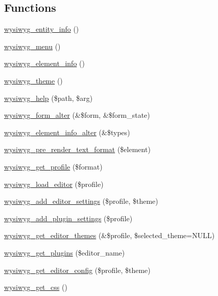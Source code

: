 \subsection*{Functions}
\begin{DoxyCompactItemize}
\item 
\hyperlink{wysiwyg_8module_abb82c2196b81d43dfdfe589eaf10a410}{wysiwyg\_\-entity\_\-info} ()
\item 
\hyperlink{wysiwyg_8module_a7bbcb615ff86965ede6de1ebdaf1f360}{wysiwyg\_\-menu} ()
\item 
\hyperlink{wysiwyg_8module_a558b7da961229a8d501fa8581d802093}{wysiwyg\_\-element\_\-info} ()
\item 
\hyperlink{wysiwyg_8module_a03b61c521946527bba7ecee753da3256}{wysiwyg\_\-theme} ()
\item 
\hyperlink{wysiwyg_8module_a4926cb9285c08293cd92c520a8161248}{wysiwyg\_\-help} (\$path, \$arg)
\item 
\hyperlink{wysiwyg_8module_a452faad91d7d0855861a5a36739013a7}{wysiwyg\_\-form\_\-alter} (\&\$form, \&\$form\_\-state)
\item 
\hyperlink{wysiwyg_8module_aa482dbbc6100de3682a8deb035a03ed5}{wysiwyg\_\-element\_\-info\_\-alter} (\&\$types)
\item 
\hyperlink{wysiwyg_8module_ad53fe3535b2c8eab8bbbb88ed694af97}{wysiwyg\_\-pre\_\-render\_\-text\_\-format} (\$element)
\item 
\hyperlink{wysiwyg_8module_aa06388aeffb7f00e3b20466dc40f71b5}{wysiwyg\_\-get\_\-profile} (\$format)
\item 
\hyperlink{wysiwyg_8module_ae494992d10299bda104526267b2cbef0}{wysiwyg\_\-load\_\-editor} (\$profile)
\item 
\hyperlink{wysiwyg_8module_ad6164d5e50ac72e9db93a555f5ed7941}{wysiwyg\_\-add\_\-editor\_\-settings} (\$profile, \$theme)
\item 
\hyperlink{wysiwyg_8module_ab2d3844da95500eafb246c12e44593c3}{wysiwyg\_\-add\_\-plugin\_\-settings} (\$profile)
\item 
\hyperlink{wysiwyg_8module_a1fe97b670fb3c1acd100c22af70b7a36}{wysiwyg\_\-get\_\-editor\_\-themes} (\&\$profile, \$selected\_\-theme=NULL)
\item 
\hyperlink{wysiwyg_8module_aa1a3edbe06c8528dd901cd199ec50918}{wysiwyg\_\-get\_\-plugins} (\$editor\_\-name)
\item 
\hyperlink{wysiwyg_8module_ab78fc846dcedb3edb5adb2b45484b035}{wysiwyg\_\-get\_\-editor\_\-config} (\$profile, \$theme)
\item 
\hyperlink{wysiwyg_8module_a372ab7c51cdabba4b7bf9b01d5522136}{wysiwyg\_\-get\_\-css} ()

\end{DoxyCompactItemize}
